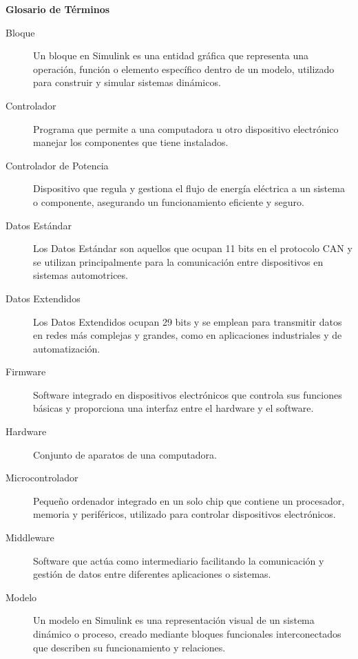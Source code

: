 \begin{center}
    {\fontsize{20}{80}\selectfont \textbf{Glosario de Términos}\\}
\end{center}
\bigskip

\begin{description}
    \item[Bloque] Un bloque en Simulink es una entidad gráfica que representa una operación, función o elemento específico dentro de un modelo, utilizado para construir y simular sistemas dinámicos.
    \item[Controlador] Programa que permite a una computadora u otro dispositivo electrónico manejar los componentes que tiene instalados.
    \item[Controlador de Potencia] Dispositivo que regula y gestiona el flujo de energía eléctrica a un sistema o componente, asegurando un funcionamiento eficiente y seguro.
    \item[Datos Estándar] Los Datos Estándar son aquellos que ocupan 11 bits en el protocolo CAN y se utilizan principalmente para la comunicación entre dispositivos en sistemas automotrices.
    \item[Datos Extendidos] Los Datos Extendidos ocupan 29 bits y se emplean para transmitir datos en redes más complejas y grandes, como en aplicaciones industriales y de automatización.
    \item[Firmware] Software integrado en dispositivos electrónicos que controla sus funciones básicas y proporciona una interfaz entre el hardware y el software.
    \item[Hardware] Conjunto de aparatos de una computadora.
    \item[Microcontrolador] Pequeño ordenador integrado en un solo chip que contiene un procesador, memoria y periféricos, utilizado para controlar dispositivos electrónicos.
    \item[Middleware] Software que actúa como intermediario facilitando la comunicación y gestión de datos entre diferentes aplicaciones o sistemas.
    \item[Modelo] Un modelo en Simulink es una representación visual de un sistema dinámico o proceso, creado mediante bloques funcionales interconectados que describen su funcionamiento y relaciones.

\end{description}

